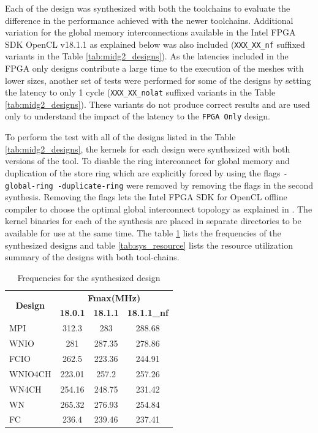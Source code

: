 Each of the design was synthesized with both the toolchains to evaluate the difference in the performance
achieved with the newer toolchains. Additional variation for the global memory interconnections available
in the Intel FPGA SDK OpenCL v18.1.1 as explained below was also included (\texttt{XXX\_XX\_nf}
suffixed variants in the Table \ref{tab:midg2_designs}).
As the latencies included in the FPGA only designs contribute
a large time to the execution of the meshes with lower sizes, another set of
tests were performed for some of the designs by setting the latency to only 1 cycle
(\texttt{XXX\_XX\_nolat} suffixed variants in the Table \ref{tab:midg2_designs}).
These variants do not produce correct results and are used only to understand the
impact of the latency to the \texttt{FPGA Only} design.

To perform the test with all of the designs listed in the Table \ref{tab:midg2_designs},
the kernels for each design were synthesized with both versions of the tool. To disable
the ring interconnect for global memory and duplication of the store ring
which are explicitly forced by using the flags \texttt{-global-ring -duplicate-ring}
were removed by removing the flags in the second synthesis. Removing the flags
lets the Intel FPGA SDK for OpenCL offline compiler to choose the optimal global
interconnect topology as explained in \cite{noauthor_intel_2019_prog, section 7.16 and 7.17}.
The kernel binaries for each of the synthesis are placed in separate directories
to be available for use at the same time. The table \ref{tab:syn_freq} lists the
frequencies of the synthesized designs and table \ref{tab:sys_resource}
lists the resource utilization summary of the designs with both tool-chains.

\begin{table}[ht]
    \centering
    \caption{Frequencies for the synthesized design }
    \label{tab:syn_freq}
    \begin{tabular}{lccc}
    \multicolumn{1}{c}{\multirow{2}{*}{\textbf{Design}}} & \multicolumn{3}{c}{\textbf{Fmax(MHz)}} \\
    \cline{2-4}
    \multicolumn{1}{c}{} & \textbf{18.0.1} & \textbf{18.1.1} & \textbf{18.1.1\_nf} \\
    \hline
    MPI & 312.3 & 283 & 288.68 \\
    WNIO & 281 & 287.35 & 278.86 \\
    FCIO & 262.5 & 223.36 & 244.91 \\
    WNIO4CH & 223.01 & 257.2 & 257.26 \\
    WN4CH & 254.16 & 248.75 & 231.42 \\
    WN & 265.32 & 276.93 & 254.84 \\
    FC & 236.4 & 239.46 & 237.41 \\
    \hline
    \end{tabular}%
\end{table}


